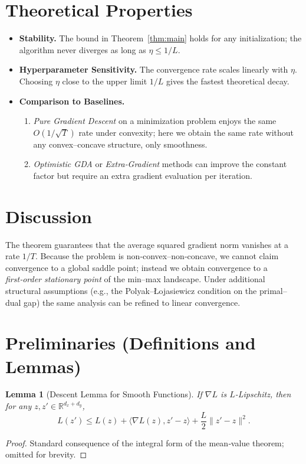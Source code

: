 \documentclass[11pt]{article}
\newtheorem{lemma}{Lemma}
\newcommand{\R}{\mathbb{R}}
\begin{document}
\section*{Theoretical Properties}
\begin{itemize}[leftmargin=*]
\item \textbf{Stability.} The bound in Theorem~\ref{thm:main} holds for any initialization; the algorithm never diverges as long as \(\eta\le 1/L\).
\item \textbf{Hyperparameter Sensitivity.} The convergence rate scales linearly with \(\eta\). Choosing \(\eta\) close to the upper limit \(1/L\) gives the fastest theoretical decay.
\item \textbf{Comparison to Baselines.}
    \begin{enumerate}
        \item \emph{Pure Gradient Descent} on a minimization problem enjoys the same \(O(1/\sqrt{T})\) rate under convexity; here we obtain the same rate without any convex–concave structure, only smoothness.
        \item \emph{Optimistic GDA} or \emph{Extra‑Gradient} methods can improve the constant factor but require an extra gradient evaluation per iteration.
    \end{enumerate}
\end{itemize}

\section*{Discussion}
The theorem guarantees that the average squared gradient norm vanishes at a rate \(1/T\). Because the problem is non‑convex–non‑concave, we cannot claim convergence to a global saddle point; instead we obtain convergence to a \emph{first‑order stationary point} of the min–max landscape. Under additional structural assumptions (e.g., the Polyak–Łojasiewicz condition on the primal–dual gap) the same analysis can be refined to linear convergence.

\newpage
\section*{Preliminaries (Definitions and Lemmas)}
\begin{lemma}[Descent Lemma for Smooth Functions]\label{lem:descent}
If \(\nabla L\) is \(L\)-Lipschitz, then for any \(z,z'\in\R^{d_{x}+d_{y}}\),
\[
L(z')\le L(z)+\langle\nabla L(z),z'-z\rangle+\frac{L}{2}\|z'-z\|^{2}.
\]
\end{lemma}
\begin{proof}
Standard consequence of the integral form of the mean‑value theorem; omitted for brevity. \qedhere
\end{proof}
\end{document}
